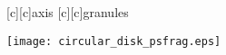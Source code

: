 \documentclass{article}
\begin{document}
\begin{figure}[htb]
  \begin{center}



        [c][c]{axis}
        [c][c]{\hspace{7mm}granules}


    \texttt{[image: circular\_disk\_psfrag.eps]}
    \end{center}
\end{figure}
\end{document}
